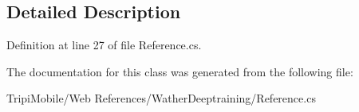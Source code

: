 \begin{DoxyCompactItemize}
\begin{DoxyCompactList}\small\item\em \item\end{DoxyCompactList}\end{DoxyCompactItemize}


\subsection{Detailed Description}


Definition at line 27 of file Reference.cs.

The documentation for this class was generated from the following file:\begin{DoxyCompactItemize}
\item 
TripiMobile/Web References/WatherDeeptraining/Reference.cs\end{DoxyCompactItemize}

